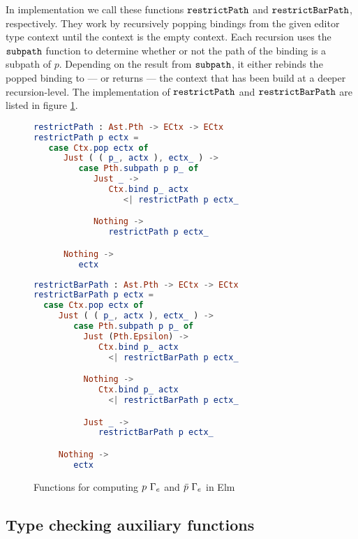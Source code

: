 In implementation we call these functions $\texttt{restrictPath}$ and
$\texttt{restrictBarPath}$, respectively. They work by recursively popping
bindings from the given editor type context until the context is the empty
context. Each recursion uses the $\texttt{subpath}$ function to determine whether
or not the path of the binding is a subpath of $p$. Depending on the result
from $\texttt{subpath}$, it either rebinds the popped binding to --- or returns ---
the context that has been build at a deeper recursion-level. The implementation
of $\texttt{restrictPath}$ and $\texttt{restrictBarPath}$ are listed in figure
\ref{fig:domainrestrictions}.

\begin{figure*}
  \center
  \noindent\begin{minipage}{.49\textwidth}
    \begin{lstlisting}[language=elm,%
                   gobble=0,%
                   ]
restrictPath : Ast.Pth -> ECtx -> ECtx
restrictPath p ectx =
   case Ctx.pop ectx of
      Just ( ( p_, actx ), ectx_ ) ->
         case Pth.subpath p p_ of
            Just _ ->
               Ctx.bind p_ actx
                  <| restrictPath p ectx_

            Nothing ->
               restrictPath p ectx_

      Nothing ->
         ectx
\end{lstlisting}
  \end{minipage}\hfill
  \begin{minipage}{.49\textwidth}
    \begin{lstlisting}[language=elm,%
                   gobble=0,%
                   ]
restrictBarPath : Ast.Pth -> ECtx -> ECtx
restrictBarPath p ectx =
  case Ctx.pop ectx of
     Just ( ( p_, actx ), ectx_ ) ->
        case Pth.subpath p p_ of
          Just (Pth.Epsilon) ->
             Ctx.bind p_ actx
               <| restrictBarPath p ectx_

          Nothing ->
             Ctx.bind p_ actx
               <| restrictBarPath p ectx_

          Just _ ->
             restrictBarPath p ectx_

     Nothing ->
        ectx
\end{lstlisting}
  \end{minipage}\hfill
  \caption{Functions for computing $p~\Gamma_{e}$ and $\bar{p}~\Gamma_{e}$ in Elm}
  \label{fig:domainrestrictions}
\end{figure*}

\subsection{Type checking auxiliary functions}

